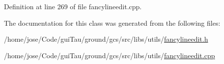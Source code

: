 Definition at line 269 of file fancylineedit.\-cpp.



The documentation for this class was generated from the following files\-:\begin{DoxyCompactItemize}
\item 
/home/jose/\-Code/gui\-Tau/ground/gcs/src/libs/utils/\hyperlink{fancylineedit_8h}{fancylineedit.\-h}\item 
/home/jose/\-Code/gui\-Tau/ground/gcs/src/libs/utils/\hyperlink{fancylineedit_8cpp}{fancylineedit.\-cpp}\end{DoxyCompactItemize}

